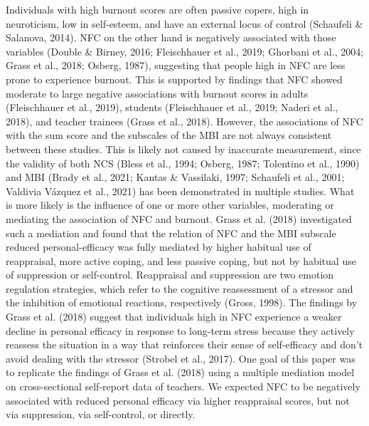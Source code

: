 \documentclass[
  english,
  man,floatsintext]{apa6}
\begin{document}
Individuals with high burnout scores are often passive copers, high in neuroticism, low in self-esteem, and have an external locus of control (Schaufeli \& Salanova, 2014).
NFC on the other hand is negatively associated with those variables (Double \& Birney, 2016; Fleischhauer et al., 2019; Ghorbani et al., 2004; Grass et al., 2018; Osberg, 1987), suggesting that people high in NFC are less prone to experience burnout.
This is supported by findings that NFC showed moderate to large negative associations with burnout scores in adults (Fleischhauer et al., 2019), students (Fleischhauer et al., 2019; Naderi et al., 2018), and teacher trainees (Grass et al., 2018).
However, the associations of NFC with the sum score and the subscales of the MBI are not always consistent between these studies.
This is likely not caused by inaccurate measurement, since the validity of both NCS (Bless et al., 1994; Osberg, 1987; Tolentino et al., 1990) and MBI (Brady et al., 2021; Kantas \& Vassilaki, 1997; Schaufeli et al., 2001; Valdivia Vázquez et al., 2021) has been demonstrated in multiple studies.
What is more likely is the influence of one or more other variables, moderating or mediating the association of NFC and burnout.
Grass et al. (2018) investigated such a mediation and found that the relation of NFC and the MBI subscale reduced personal-efficacy was fully mediated by higher habitual use of reappraisal, more active coping, and less passive coping, but not by habitual use of suppression or self-control.
Reappraisal and suppression are two emotion regulation strategies, which refer to the cognitive reassessment of a stressor and the inhibition of emotional reactions, respectively (Gross, 1998).
The findings by Grass et al. (2018) suggest that individuals high in NFC experience a weaker decline in personal efficacy in response to long-term stress because they actively reassess the situation in a way that reinforces their sense of self-efficacy and don't avoid dealing with the stressor (Strobel et al., 2017).
One goal of this paper was to replicate the findings of Grass et al. (2018) using a multiple mediation model on cross-sectional self-report data of teachers.
We expected NFC to be negatively associated with reduced personal efficacy via higher reappraisal scores, but not via suppression, via self-control, or directly.
\end{document}
